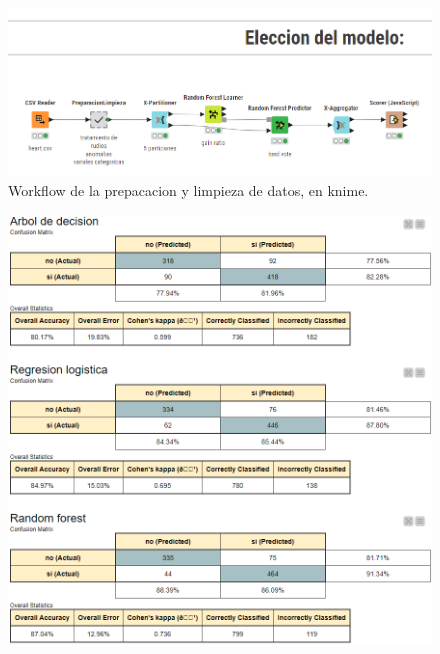 \documentclass[12pt, letterpaper]{article}
\begin{document}
\begin{figure}
    \centering
    \includegraphics[scale=0.59]{entrega4.png}
    \caption{Workflow de la prepacacion y limpieza de datos, en knime.}
    \label{fig:Workflow4}
\end{figure}

\begin{figure}
    \centering
    \includegraphics[scale=0.58]{tecnicas1.png}
    \caption{}
    \label{fig:tecnicas1}
\end{figure}
\end{document}
